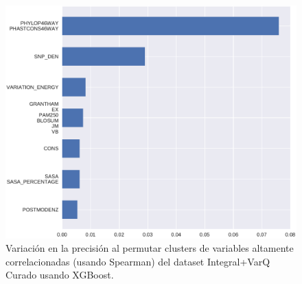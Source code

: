 \begin{figure}[H]
    \centering
    \includegraphics[scale=0.45]{documents/latex/figures/3/integral_varq/integral_varq_importance_cluster_xgb.pdf}
    \caption{Variación en la precisión al permutar clusters de variables altamente correlacionadas (usando Spearman) del dataset Integral+VarQ Curado usando XGBoost.}
    \label{fig:importance_cluster_integral_varq_xgb}
\end{figure}



